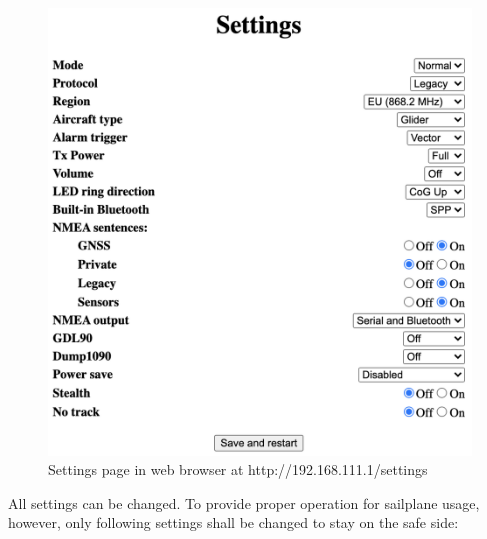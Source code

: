 \documentclass[11pt,a4paper]{article}
\begin{document}
\begin{figure}[h]
\centering
\includegraphics[scale=.6]{settings.png}
\caption{Settings page in web browser at http://192.168.111.1/settings}\label{settings}
\end{figure}\FloatBarrier

All settings can be changed. To provide proper operation for sailplane usage, however, only following settings shall be changed to stay on the safe side:
\end{document}
